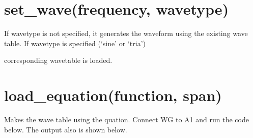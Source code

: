 \documentclass[a4paper,12pt,english]{sphinxmanual}
\begin{document}
\section{set\_wave(frequency, wavetype)}
\label{\detokenize{7.1:set-wave-frequency-wavetype}}
If wavetype is not specified, it generates the waveform using the
existing wave table. If wavetype is specified (‘sine’ or ‘tria’)

corresponding wavetable is loaded.

\begin{sphinxVerbatim}[commandchars=\\\{\}]
   
 
       
   
   
   
\end{sphinxVerbatim}


\section{load\_equation(function, span)}
\label{\detokenize{7.1:load-equation-function-span}}
Makes the wave table using the quation. Connect WG to A1 and run the
code below. The output also is shown below.
\end{document}
